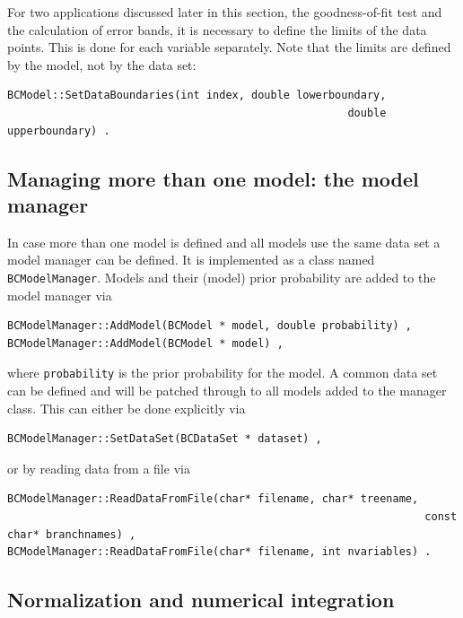 \documentclass[11pt, a4paper]{article}
\begin{document}
For two applications discussed later in this section, the
goodness-of-fit test and the calculation of error bands, it is
necessary to define the limits of the data points. This is done for
each variable separately. Note that the limits are defined by the
model, not by the data set:
%
\begin{verbatim}
BCModel::SetDataBoundaries(int index, double lowerboundary,
													 double upperboundary) .
\end{verbatim}


\subsection{Managing more than one model: the model manager}
\label{subsection:modelmanager}

In case more than one model is defined and all models use the same
data set a model manager can be defined. It is implemented as a class
named \verb|BCModelManager|. Models and their (model) prior
probability are added to the model manager via
%
\begin{verbatim}
BCModelManager::AddModel(BCModel * model, double probability) ,
BCModelManager::AddModel(BCModel * model) ,
\end{verbatim}

\noindent
where \verb|probability| is the prior probability for the model. A
common data set can be defined and will be patched through to all
models added to the manager class. This can either be done explicitly
via
%
\begin{verbatim}
BCModelManager::SetDataSet(BCDataSet * dataset) ,
\end{verbatim}

\noindent
or by reading data from a file via
%
\begin{verbatim}
BCModelManager::ReadDataFromFile(char* filename, char* treename,
																 const char* branchnames) ,
BCModelManager::ReadDataFromFile(char* filename, int nvariables) .
\end{verbatim}


\subsection{Normalization and numerical integration}
\label{section:normalization}
\end{document}
